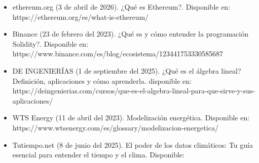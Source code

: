 \documentclass[oneside,11pt]{Latex/Classes/PhDthesisPSnPDF}
\begin{document}
\begin{flushleft}
\begin{itemize}
  \item ethereum.org (3 de abril de 2026). ¿Qué es Ethereum?. Disponible en: 
https://ethereum.org/es/what-is-ethereum/
  \item Binance (23 de febrero del 2023). ¿Qué es y cómo entender la programación Solidity?. Disponible en: https://www.binance.com/es/blog/ecosistema/123441753330585687
  \item DE INGENIERÍAS (1 de septiembre del 2025). ¿Qué es el álgebra lineal? Definición, aplicaciones y cómo aprenderla. disponible en: https://deingenierias.com/cursos/que-es-el-algebra-lineal-para-que-sirve-y-sus-aplicaciones/
  \item WTS Energy (11 de abril del 2023). Modelización energética. Disponible en: https://www.wtsenergy.com/es/glossary/modelizacion-energetica/
  \item Tutiempo.net (8 de junio del 2025). El poder de los datos climáticos: Tu guía esencial para entender el tiempo y el clima. Disponible: 
\end{itemize}
\end{flushleft}

\renewcommand{\bibname}{Lista de Referencias}
 
 

\end{document}
